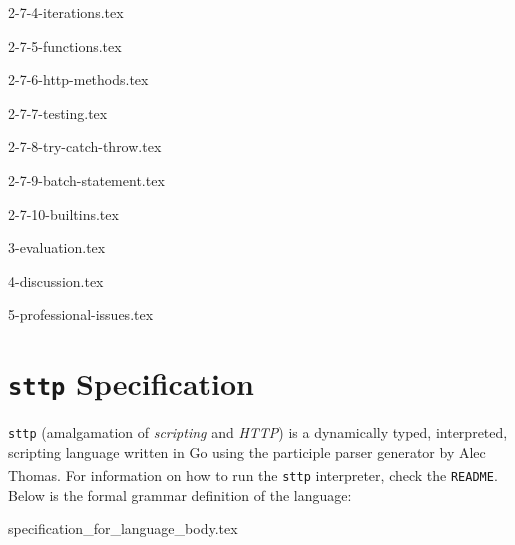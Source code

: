 \documentclass[]{full}
\theoremstyle{definition}
\begin{document}
{2-7-4-iterations.tex}

{2-7-5-functions.tex}

{2-7-6-http-methods.tex}

{2-7-7-testing.tex}

{2-7-8-try-catch-throw.tex}

{2-7-9-batch-statement.tex}

{2-7-10-builtins.tex}

{3-evaluation.tex}

{4-discussion.tex}

{5-professional-issues.tex}


\appendix

\cprotect\chapter{\verb|sttp| Specification}
\label{appendix:sttp-specification}

\verb|sttp| (amalgamation of \textit{scripting} and \textit{HTTP}) is a dynamically typed, interpreted, scripting language written in Go using the participle parser generator by Alec Thomas\textsuperscript{\cite{thomas_2021}}. For information on how to run the \verb|sttp| interpreter, check the \verb|README|. Below is the formal grammar definition of the language:

{specification_for_language_body.tex}

\newpage
\label{endpage}

\printbibheading
\printbibliography[keyword=cite,heading=subbibliography,title={Cited material}]%
\nocite{*}
\printbibliography[keyword=nocite,heading=subbibliography,title={Supplementary material}]
\end{document}
